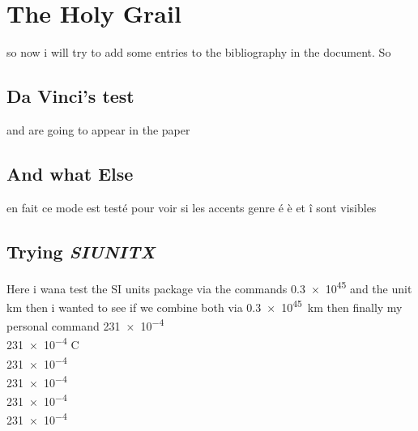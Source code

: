 \chapter{The Holy Grail}


\lipsum[15-17]
so now i will try to add some entries to the bibliography in the document. So  %
\section{Da Vinci's test}
\cite{auburtin_determination_1998} and \cite{carozzani_direct_2013} are going to appear in the paper 

\section{And what Else}
en fait ce mode est testé pour voir si les accents genre é è et î sont visibles


\section{Trying \emph{SIUNITX}}
Here i wana test the SI units package via the commands \num{.3e45} and the unit \si{\kilo\metre}
then i wanted to see if we combine both via \SI{.3e45}{\kilo\metre} then finally my personal command
\SI{231e-4}{\acceleration} \\
\SI{231e-4}{\composition} C \\
\SI{231e-4}{\velocity} \\
\SI{231e-4}{\conductivity} \\
\SI{231e-4}{\masscapacity} \\
\SI{231e-4}{\volumecapacity} \\
